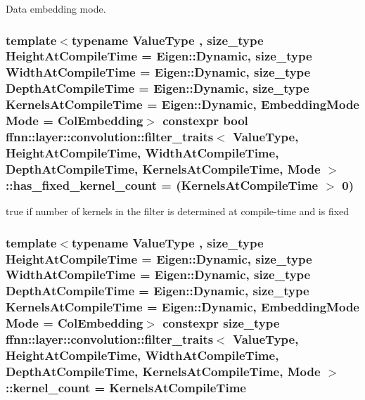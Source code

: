 Data embedding mode. 

\hypertarget{structffnn_1_1layer_1_1convolution_1_1filter__traits_ad3ff87b2289f699c8d84e96eb35ebc2f}{
\subsubsection[{has\-\_\-fixed\-\_\-kernel\-\_\-count}]{\setlength{\rightskip}{0pt plus 5cm}template$<$typename Value\-Type , size\-\_\-type Height\-At\-Compile\-Time = Eigen\-::\-Dynamic, size\-\_\-type Width\-At\-Compile\-Time = Eigen\-::\-Dynamic, size\-\_\-type Depth\-At\-Compile\-Time = Eigen\-::\-Dynamic, size\-\_\-type Kernels\-At\-Compile\-Time = Eigen\-::\-Dynamic, Embedding\-Mode Mode = Col\-Embedding$>$ constexpr bool {\bf ffnn\-::layer\-::convolution\-::filter\-\_\-traits}$<$ Value\-Type, Height\-At\-Compile\-Time, Width\-At\-Compile\-Time, Depth\-At\-Compile\-Time, Kernels\-At\-Compile\-Time, Mode $>$\-::has\-\_\-fixed\-\_\-kernel\-\_\-count = (Kernels\-At\-Compile\-Time $>$ 0)\hspace{0.3cm}{\ttfamily [static]}}}\label{structffnn_1_1layer_1_1convolution_1_1filter__traits_ad3ff87b2289f699c8d84e96eb35ebc2f}


{\ttfamily true} if number of kernels in the filter is determined at compile-\/time and is fixed 

\hypertarget{structffnn_1_1layer_1_1convolution_1_1filter__traits_a16246d9d3f33c752ca20d6f53a469f9a}{
\subsubsection[{kernel\-\_\-count}]{\setlength{\rightskip}{0pt plus 5cm}template$<$typename Value\-Type , size\-\_\-type Height\-At\-Compile\-Time = Eigen\-::\-Dynamic, size\-\_\-type Width\-At\-Compile\-Time = Eigen\-::\-Dynamic, size\-\_\-type Depth\-At\-Compile\-Time = Eigen\-::\-Dynamic, size\-\_\-type Kernels\-At\-Compile\-Time = Eigen\-::\-Dynamic, Embedding\-Mode Mode = Col\-Embedding$>$ constexpr {\bf size\-\_\-type} {\bf ffnn\-::layer\-::convolution\-::filter\-\_\-traits}$<$ Value\-Type, Height\-At\-Compile\-Time, Width\-At\-Compile\-Time, Depth\-At\-Compile\-Time, Kernels\-At\-Compile\-Time, Mode $>$\-::kernel\-\_\-count = Kernels\-At\-Compile\-Time\hspace{0.3cm}{\ttfamily [static]}}}\label{structffnn_1_1layer_1_1convolution_1_1filter__traits_a16246d9d3f33c752ca20d6f53a469f9a}


